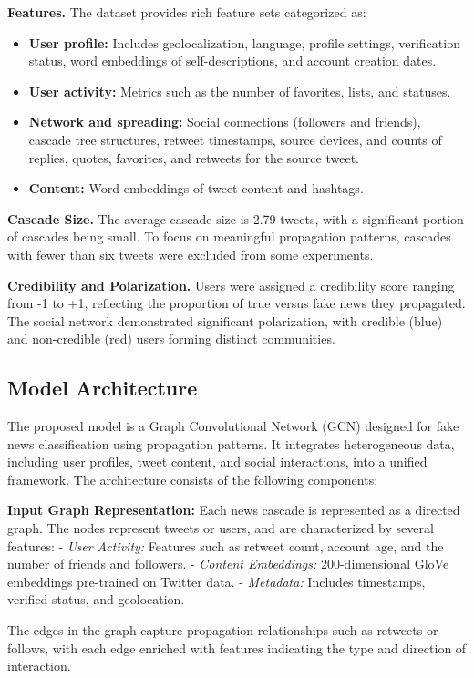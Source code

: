\documentclass[sigconf,nonacm]{acmart}
\begin{document}
\textbf{Features.} The dataset provides rich feature sets categorized as: \begin{itemize} \item \textbf{User profile:} Includes geolocalization, language, profile settings, verification status, word embeddings of self-descriptions, and account creation dates. \item \textbf{User activity:} Metrics such as the number of favorites, lists, and statuses. \item \textbf{Network and spreading:} Social connections (followers and friends), cascade tree structures, retweet timestamps, source devices, and counts of replies, quotes, favorites, and retweets for the source tweet. \item \textbf{Content:} Word embeddings of tweet content and hashtags. \end{itemize}

\textbf{Cascade Size.} The average cascade size is 2.79 tweets, with a significant portion of cascades being small. To focus on meaningful propagation patterns, cascades with fewer than six tweets were excluded from some experiments.

\textbf{Credibility and Polarization.} Users were assigned a credibility score ranging from -1 to +1, reflecting the proportion of true versus fake news they propagated. The social network demonstrated significant polarization, with credible (blue) and non-credible (red) users forming distinct communities.
\subsection{Model Architecture}

The proposed model is a Graph Convolutional Network (GCN) designed for fake news classification using propagation patterns. It integrates heterogeneous data, including user profiles, tweet content, and social interactions, into a unified framework. The architecture consists of the following components:

\textbf{Input Graph Representation:}  
Each news cascade is represented as a directed graph. The nodes represent tweets or users, and are characterized by several features:
- \textit{User Activity:} Features such as retweet count, account age, and the number of friends and followers.
- \textit{Content Embeddings:} 200-dimensional GloVe embeddings pre-trained on Twitter data.
- \textit{Metadata:} Includes timestamps, verified status, and geolocation.

The edges in the graph capture propagation relationships such as retweets or follows, with each edge enriched with features indicating the type and direction of interaction.
\end{document}

